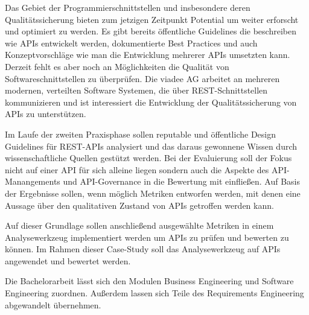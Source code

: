 \documentclass[../../expose]{subfiles}
\begin{document}
Das Gebiet der Programmierschnittstellen und insbesondere deren Qualitätssicherung bieten zum jetzigen Zeitpunkt Potential um weiter erforscht und optimiert zu werden. Es gibt bereits öffentliche Guidelines die beschreiben wie APIs entwickelt werden, dokumentierte Best Practices und auch Konzeptvorschläge wie man die Entwicklung mehrerer APIs umsetzten kann. Derzeit fehlt es  aber noch an Möglichkeiten die Qualität von Softwareschnittstellen zu überprüfen. 
Die viadee AG arbeitet an mehreren modernen, verteilten Software Systemen, die über REST-Schnittstellen kommunizieren und ist interessiert die Entwicklung der Qualitätssicherung von APIs zu unterstützen. 

Im Laufe der zweiten Praxisphase sollen reputable und öffentliche Design Guidelines für REST-APIs analysiert  und das daraus gewonnene Wissen durch wissenschaftliche Quellen gestützt werden. Bei der Evaluierung soll der Fokus nicht auf einer API für sich alleine liegen sondern auch die Aspekte des API-Manangements und API-Governance in die Bewertung mit einfließen. Auf Basis der Ergebnisse sollen, wenn möglich Metriken entworfen werden, mit denen eine Aussage über den qualitativen Zustand von APIs getroffen werden kann.

Auf dieser Grundlage sollen anschließend  ausgewählte Metriken in einem Analysewerkzeug implementiert werden um APIs zu prüfen und bewerten zu können. Im Rahmen dieser Case-Study soll das Analysewerkzeug auf APIs angewendet und  bewertet werden. 

Die Bachelorarbeit lässt sich den Modulen Business Engineering und Software Engineering zuordnen. Außerdem lassen sich Teile des Requirements Engineering abgewandelt übernehmen.


\end{document}
